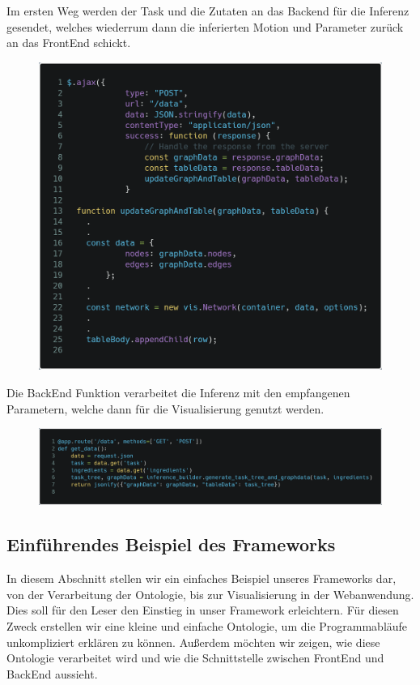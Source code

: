 Im ersten Weg werden der Task und die Zutaten an das Backend für die Inferenz gesendet, welches wiederrum dann die inferierten Motion und Parameter zurück an das FrontEnd schickt.

\begin{figure}[H]
    \includegraphics[scale=0.25]{Graphics/inference_builder_js.png}
\end{figure}

Die BackEnd Funktion verarbeitet die Inferenz mit den empfangenen Parametern, welche dann für die Visualisierung genutzt werden.

\begin{figure}[H]
    \includegraphics[scale=0.25]{Graphics/get_data.png}
\end{figure}
\subsection*{Einführendes Beispiel des Frameworks}
In diesem Abschnitt stellen wir ein einfaches Beispiel unseres Frameworks dar, von der Verarbeitung der Ontologie, bis zur Visualisierung in der Webanwendung.
Dies soll für den Leser den Einstieg in unser Framework erleichtern. 
Für diesen Zweck erstellen wir eine kleine und einfache Ontologie, um die Programmabläufe unkompliziert erklären zu können.
Außerdem möchten wir zeigen, wie diese Ontologie verarbeitet wird und wie die Schnittstelle zwischen FrontEnd und BackEnd aussieht.




